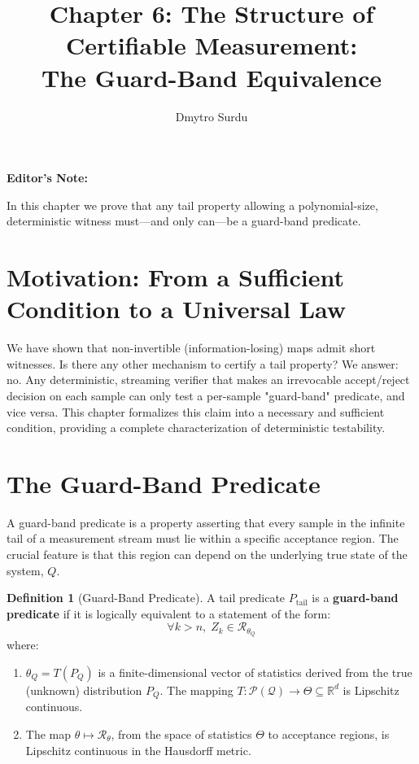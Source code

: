 \documentclass[12pt]{article}
\title{\textbf{Chapter 6: The Structure of Certifiable Measurement: \\ The Guard-Band Equivalence}}
\author{Dmytro Surdu}
\date{}
\theoremstyle{definition}
\newtheorem{definition}{Definition}[section]
\theoremstyle{plain}
\newenvironment{editorsnote}{%
  \begin{framed}
  \noindent\textbf{Editor's Note:}\em
}{\end{framed}}
\begin{document}
\maketitle

\begin{editorsnote}
In this chapter we prove that any tail property allowing a polynomial-size, deterministic witness must—and only can—be a guard-band predicate.
\end{editorsnote}

\section{Motivation: From a Sufficient Condition to a Universal Law}

We have shown that non-invertible (information-losing) maps admit short witnesses. Is there any other mechanism to certify a tail property? We answer: no. Any deterministic, streaming verifier that makes an irrevocable accept/reject decision on each sample can only test a per-sample "guard-band" predicate, and vice versa. This chapter formalizes this claim into a necessary and sufficient condition, providing a complete characterization of deterministic testability.

\section{The Guard-Band Predicate}

A guard-band predicate is a property asserting that every sample in the infinite tail of a measurement stream must lie within a specific acceptance region. The crucial feature is that this region can depend on the underlying true state of the system, $Q$.

\begin{definition}[Guard-Band Predicate]
A tail predicate $P_{\mathrm{tail}}$ is a \textbf{guard-band predicate} if it is logically equivalent to a statement of the form:
\[
\forall k > n, \; Z_k \in \mathcal{R}_{\theta_Q}
\]
where:
\begin{enumerate}
    \item $\theta_Q = T(P_Q)$ is a finite-dimensional vector of statistics derived from the true (unknown) distribution $P_Q$. The mapping $T: \mathcal{P}(\mathcal{Q}) \to \Theta \subseteq \mathbb{R}^d$ is Lipschitz continuous.
    \item The map $\theta \mapsto \mathcal{R}_{\theta}$, from the space of statistics $\Theta$ to acceptance regions, is Lipschitz continuous in the Hausdorff metric.
\end{enumerate}
\end{definition}
\end{document}
